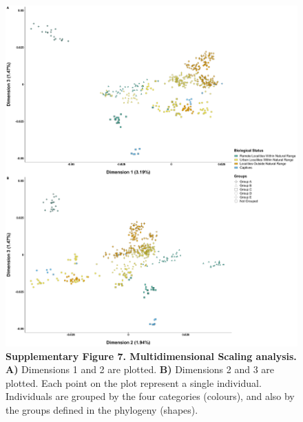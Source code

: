\documentclass[twoside, british, a4paper]{article}
\begin{document}
\begin{figure}
\centering
\includegraphics[width=1\textwidth]{../FPG--Pipeline/FPG--Plots/FPG--MDS/FPG--MDS_SI.pdf}
\captionsetup{labelformat=empty}
\caption[\textbf{Supplementary Figure 7. Multidimensional Scaling analysis.}]{\textbf{Supplementary Figure 7. Multidimensional Scaling analysis.} \textbf{A)} Dimensions 1 and 2 are plotted. \textbf{B)} Dimensions 2 and 3 are plotted. Each point on the plot represent a single individual. Individuals are grouped by the four categories (colours), and also by the groups defined in the phylogeny (shapes).}
\label{MainText:FPG--MDS_SI}
\end{figure}
\end{document}
